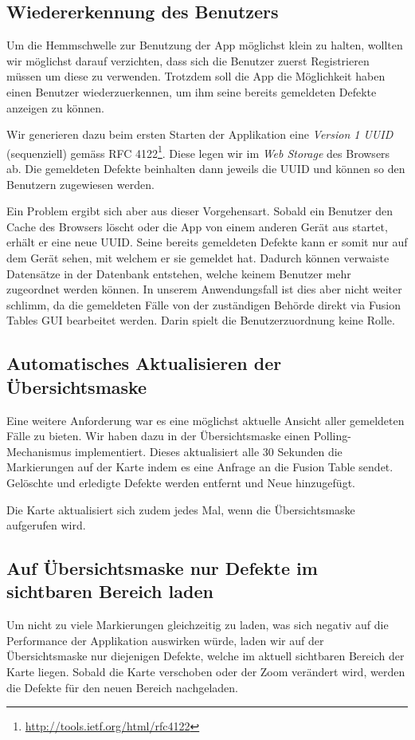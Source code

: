 \subsection{Wiedererkennung des Benutzers}
\label{fixmystreet-user-detection}
Um die Hemmschwelle zur Benutzung der App möglichst klein zu halten, wollten wir möglichst darauf verzichten, dass sich die Benutzer zuerst Registrieren müssen um diese zu verwenden. Trotzdem soll die App die Möglichkeit haben einen Benutzer wiederzuerkennen, um ihm seine bereits gemeldeten Defekte anzeigen zu können.

Wir generieren dazu beim ersten Starten der Applikation eine \emph{Version 1 \gls{UUID}} (sequenziell) gemäss RFC 4122\footnote{\url{http://tools.ietf.org/html/rfc4122}}. Diese legen wir im \emph{Web Storage} des Browsers ab. Die gemeldeten Defekte beinhalten dann jeweils die \gls{UUID} und können so den Benutzern zugewiesen werden.

Ein Problem ergibt sich aber aus dieser Vorgehensart. Sobald ein Benutzer den Cache des Browsers löscht oder die App von einem anderen Gerät aus startet, erhält er eine neue \gls{UUID}. Seine bereits gemeldeten Defekte kann er somit nur auf dem Gerät sehen, mit welchem er sie gemeldet hat. Dadurch können verwaiste Datensätze in der Datenbank entstehen, welche keinem Benutzer mehr zugeordnet werden können. In unserem Anwendungsfall ist dies aber nicht weiter schlimm, da die gemeldeten Fälle von der zuständigen Behörde direkt via Fusion Tables GUI bearbeitet werden. Darin spielt die Benutzerzuordnung keine Rolle.

\subsection{Automatisches Aktualisieren der Übersichtsmaske}
\label{fixmystreet-polling}
Eine weitere Anforderung war es eine möglichst aktuelle Ansicht aller gemeldeten Fälle zu bieten. Wir haben dazu in der Übersichtsmaske einen Polling-Mechanismus implementiert. Dieses aktualisiert alle 30 Sekunden die Markierungen auf der Karte indem es eine Anfrage an die Fusion Table sendet. Gelöschte und erledigte Defekte werden entfernt und Neue hinzugefügt.

Die Karte aktualisiert sich zudem jedes Mal, wenn die Übersichtsmaske aufgerufen wird.

\subsection{Auf Übersichtsmaske nur Defekte im sichtbaren Bereich laden}
Um nicht zu viele Markierungen gleichzeitig zu laden, was sich negativ auf die Performance der Applikation auswirken würde, laden wir auf der Übersichtsmaske nur diejenigen Defekte, welche im aktuell sichtbaren Bereich der Karte liegen. Sobald die Karte verschoben oder der Zoom verändert wird, werden die Defekte für den neuen Bereich nachgeladen.

